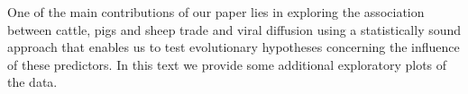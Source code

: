 \documentclass[a4paper,10pt]{article}
\begin{document}
One of the main contributions of our paper lies in exploring the association between cattle, pigs and sheep trade and viral diffusion using a statistically sound approach that enables us to test evolutionary hypotheses concerning the influence of these predictors.
In this text we provide some additional exploratory plots of the data.
\end{document}
